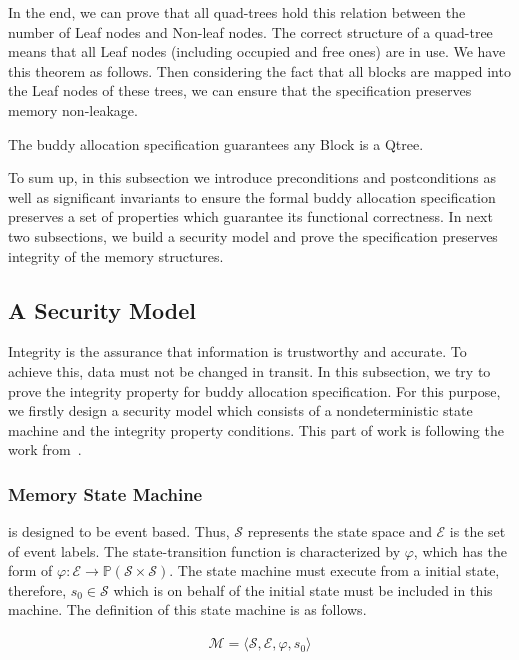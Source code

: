 In the end, we can prove that all quad-trees hold this relation between the number of Leaf nodes and Non-leaf nodes. The correct structure of a quad-tree means that all Leaf nodes (including occupied and free ones) are in use. We have this theorem as follows. Then considering the fact that all blocks are mapped into the Leaf nodes of these trees, we can ensure that the specification preserves memory non-leakage.

\begin{theorem}
The buddy allocation specification guarantees any Block is a Qtree.
\end{theorem}

To sum up, in this subsection we introduce preconditions and postconditions as well as significant invariants to ensure the formal buddy allocation specification preserves a set of properties which guarantee its functional correctness. In next two subsections, we build a security model and prove the specification preserves integrity of the memory structures.

\subsection{A Security Model}\label{sec:securitymodel}
Integrity is the assurance that information is trustworthy and accurate. To achieve this, data must not be changed in transit. In this subsection, we try to prove the integrity property for buddy allocation specification. For this purpose, we firstly design a security model which consists of a nondeterministic state machine and the integrity property conditions. This part of work is following the work from~\cite{reg_securitymodel}.

\subsubsection{Memory State Machine} is designed to be event based. Thus, $\mathcal{S}$ represents the state space and $\mathcal{E}$ is the set of event labels. The state-transition function is characterized by $\varphi$, which has the form of $\varphi: \mathcal{E} \rightarrow \mathbb{P}(\mathcal{S} \times \mathcal{S})$. The state machine must execute from a initial state, therefore, $s_0 \in \mathcal{S}$ which is on behalf of the initial state must be included in this machine. The definition of this state machine is as follows.

\begin{definition} 
\vspace{-7pt}
\end{definition}	
{\footnotesize
\begin{align*}
\mathcal{M} = \langle \mathcal{S}, \mathcal{E}, \varphi, s_0 \rangle
\end{align*}
}
\vspace{-12pt}

